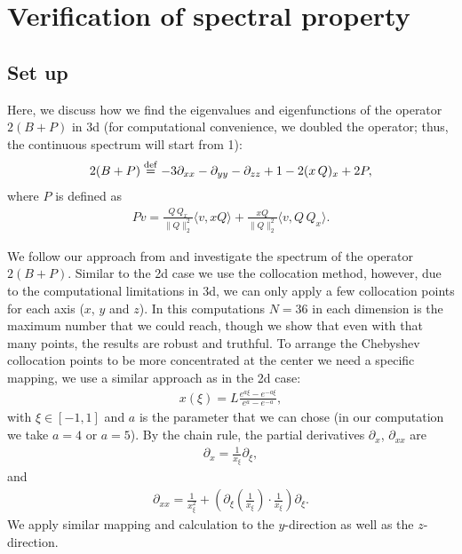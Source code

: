 \documentclass[12pt,letterpaper]{amsart}
\newcommand{\defeq}{\stackrel{\rm{def}}{=}}
\theoremstyle{remark}
\numberwithin{equation}{section}
\numberwithin{theorem}{section}
\numberwithin{table}{section}
\begin{document}
\section{Verification of spectral property} %
\label{S:numerics}


\subsection{Set up}
Here, we discuss how we find the eigenvalues and eigenfunctions of the operator $2(B+P)$ in 3d (for computational convenience, we doubled the operator; thus, the continuous spectrum will start from 1):
\begin{align}
2(B+P) \defeq-3\partial_{xx}-\partial_{yy} -\partial_{zz} + 1 - 2(x\, Q)_x + 2P,
\end{align}
where $P$ is defined as 
\begin{align}
Pv= \frac{Q \, Q_x}{\|Q\|_2^2}\langle v, xQ \rangle + \frac{xQ}{\|Q\|_2^2} \langle v, Q\, Q_x \rangle.
\end{align}

We follow our approach from \cite[Section 16]{FHRY} and investigate the spectrum of the operator $2(B+P)$. Similar to the 2d case we use the collocation method, however, due to the computational limitations in 3d, we can only apply a few collocation points for each axis ($x$, $y$ and $z$). In this computations $N=36$ in each dimension is the maximum number that we could reach, though we show that even with that many points, the results are robust and truthful. 
To arrange the Chebyshev collocation points to be more concentrated at the center we need a specific mapping, we use a similar approach as in the 2d case:
\begin{align}\label{D: x mapping}
x(\xi)=L\frac{e^{a\xi}-e^{-a\xi}}{e^{a}-e^{-a}},
\end{align}
with $\xi \in [-1,1]$ and $a$ is the parameter that we can chose (in our computation we take $a=4$ or $a=5$). By the chain rule, the partial derivatives $\partial_x$, $\partial_{xx}$ are
\begin{align}\label{E:D1}
\partial_x=\frac{1}{x_{\xi}}\partial_{\xi},
\end{align}
and
\begin{align}\label{E:D2}
\partial_{xx}=\frac{1}{x_{\xi}^2}+\left(\partial_{\xi}(\frac{1}{x_{\xi}})\cdot\frac{1}{x_{\xi}}\right)\partial_{\xi}.
\end{align}
We apply similar mapping and calculation to the $y$-direction as well as the $z$-direction.
\end{document}
